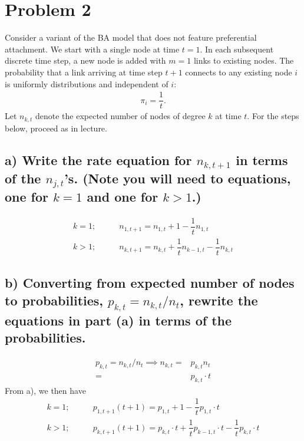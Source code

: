 \documentclass{tufte-handout}
\begin{document}
% 

\section{Problem 2}
Consider a variant of the BA model that does not feature preferential attachment.
We start with a single node at time $t = 1$. In each subsequent discrete time step, a
new node is added with $m = 1$ links to existing nodes. The probability that a link
arriving at time step $t + 1$ connects to any existing node $i$ is uniformly distributions
and independent of $i$:
\begin{align*}
\pi_i = \dfrac{1}{t}.
\end{align*}
Let $n_{k,t}$ denote the expected number of nodes of degree $k$ at time $t$. For the steps below, proceed as in lecture.

\subsection{a)
Write the rate equation for $n_{k,t+1}$ in terms of the $n_{j,t}$'s. (Note you will need to equations, one for $k = 1$ and one for $k > 1$.)}

\begin{align*}
k = 1; \hspace{2em} & n_{1,t+1} = n_{1,t} + 1 - \dfrac{1}{t} n_{1,t} \\
k > 1; \hspace{2em} & n_{k,t+1} = n_{k,t} + \dfrac{1}{t}n_{k-1,t} - \dfrac{1}{t} n_{k,t}
\end{align*}

\subsection{b)
Converting from expected number of nodes to probabilities, $p_{k,t} = n_{k,t}/n_t$, rewrite the equations in part (a) in terms of the probabilities.}

\begin{align*}
p_{k,t} = n_{k,t}/n_t \implies n_{k,t} =& p_{k,t} n_t \\
                                       =& p_{k,t} \cdot t
\end{align*}
From a), we then have
\begin{align*}
k = 1; \hspace{2em} & p_{1,t+1} (t+1) = p_{1,t} + 1 - \dfrac{1}{t} p_{1,t} \cdot t \\
k > 1; \hspace{2em} & p_{k,t+1} (t+1) = p_{k,t} \cdot t + \dfrac{1}{t} p_{k-1,t} \cdot{t} - \dfrac{1}{t} p_{k,t} \cdot{t}
\end{align*}
\end{document}
